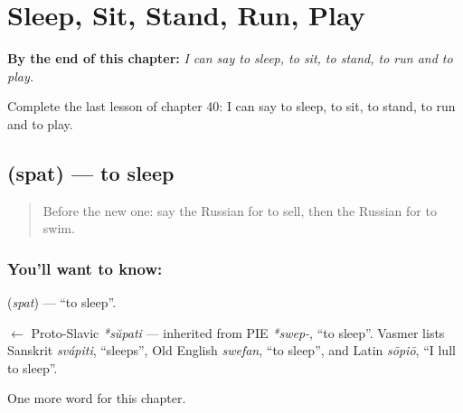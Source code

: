 
\chapter{Sleep, Sit, Stand, Run, Play}
\label{ch:ru-sleep-sit-stand-run-play}

\begin{chapteropening}
\textbf{By the end of this chapter:} \emph{I can say to sleep, to sit, to stand, to run and to play.}

Complete the last lesson of chapter 40: I can say to sleep, to sit, to stand, to run and to play.
\end{chapteropening}

\section[\texorpdfstring{\ru{спать} (spat)}{спать (spat)}]{ (spat) — to sleep}

\label{lesson:RU-C40-spat}



\begin{quote}
Before the new one: say the Russian for to sell, then the Russian for to swim.
\end{quote}

\subsection*{You'll want to know: }
\textbf{} (\emph{spat}) — \textquotedblleft{}to sleep\textquotedblright{}.

\begin{cousinweb}
\textbf{} $\leftarrow$ Proto-Slavic \emph{*sŭpati} — inherited from PIE \emph{*swep-}, \textquotedblleft{}to sleep\textquotedblright{}. Vasmer lists Sanskrit \emph{svápiti}, \textquotedblleft{}sleeps\textquotedblright{}, Old English \emph{swefan}, \textquotedblleft{}to sleep\textquotedblright{}, and Latin \emph{sōpiō}, \textquotedblleft{}I lull to sleep\textquotedblright{}.
\end{cousinweb}

\begin{grammarlens}[title={What you've built}]
One more word for this chapter.
\end{grammarlens}

